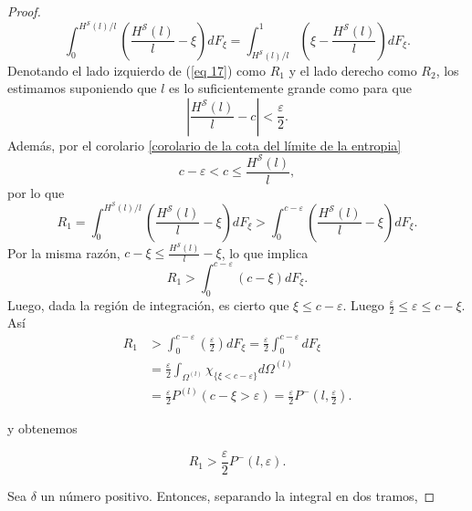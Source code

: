 \documentclass{report}
\begin{document}
\begin{proof}
    \begin{equation}\label{eq 17}
    \int_{0}^{H^{\mathcal{S}}(l)/l} \left( \frac{H^{\mathcal{S}}(l)}{l} - \xi \right) dF_{\xi} =
    \int_{H^{\mathcal{S}}(l)/l}^{1} \left( \xi - \frac{H^{\mathcal{S}}(l)}{l} \right) dF_{\xi}.
    \end{equation}
    Denotando el lado izquierdo de (\ref{eq 17}) como \( R_1 \) y el lado derecho como \( R_2 \), 
    los estimamos suponiendo que \( l \) es lo suficientemente grande como para que 
    \[
    \left| \frac{H^{\mathcal{S}}(l)}{l} - c \right| < \frac{\varepsilon}{2}.
    \]
    Además, por el corolario \ref{corolario de la cota del límite de la entropia}
    \[
        c-\varepsilon < c \leq \frac{H^{\mathcal{S}}(l)}{l},
    \]
    por lo que
    \[
        R_1 = \int_{0}^{H^{\mathcal{S}}(l)/l} \left( \frac{H^{\mathcal{S}}(l)}{l} - \xi \right) dF_{\xi}
        > \int_{0}^{c-\varepsilon} \left( \frac{H^{\mathcal{S}}(l)}{l} - \xi \right) dF_{\xi}.
    \]
    Por la misma razón, $c-\xi \leq  \frac{H^{\mathcal{S}}(l)}{l} - \xi$, lo que implica
    \[
        R_1 > \int_{0}^{c-\varepsilon} \left( c - \xi \right) dF_{\xi}.
    \]
    Luego, dada la región de integración, es cierto que $\xi \leq c-\varepsilon$. Luego $\frac{\varepsilon}{2} \leq \varepsilon \leq c-\xi$. Así
    \begin{equation*}
    \begin{aligned}
        R_1 &> \int_{0}^{c-\varepsilon} \left( \frac{\varepsilon}{2}  \right) dF_{\xi} = \frac{\varepsilon}{2} \int_{0}^{c-\varepsilon}dF_{\xi} \\
        &= \frac{\varepsilon}{2} \int_{\Omega^{(l)}} \chi_{\{\xi< c-\varepsilon\}} d\Omega^{(l)} \\
        &= \frac{\varepsilon}{2} P^{(l)}(c-\xi>\varepsilon) 
        = \frac{\varepsilon}{2} P^-\left(l,\frac{\varepsilon}{2}\right).
    \end{aligned}
    \end{equation*}
    
    y obtenemos
    
    \begin{equation}\label{eq 18}
    R_1 > \frac{\varepsilon}{2} P^-(l, \varepsilon).
    \end{equation}
    \bigskip

    Sea \( \delta \) un número positivo. Entonces, separando la integral en dos tramos,


\end{proof}
\end{document}
